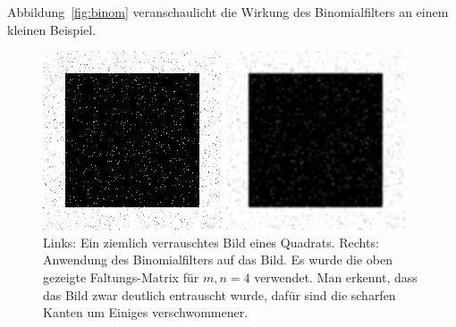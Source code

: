 \begin{example}
\begin{description}
  Abbildung~\ref{fig:binom} veranschaulicht die Wirkung des Binomialfilters an einem kleinen
  Beispiel.
  \begin{figure}[ht]
  \centering
  \begin{minipage}{0.4\textwidth}
    \includegraphics[width=0.7\linewidth]{Bilder/noise}
  \end{minipage}
  \begin{minipage}{0.4\textwidth}
    \includegraphics[width=0.7\linewidth]{Bilder/noise_binom}
  \end{minipage}
  \caption{Links: Ein ziemlich verrauschtes Bild eines Quadrats. Rechts: Anwendung des
    Binomialfilters auf das Bild. Es wurde die oben gezeigte Faltungs-Matrix für $ m,n = 4 $ 
    verwendet. Man erkennt, dass das Bild zwar deutlich entrauscht wurde, dafür sind die scharfen
    Kanten um Einiges verschwommener.}

\end{figure}
\end{description}
\end{example}
